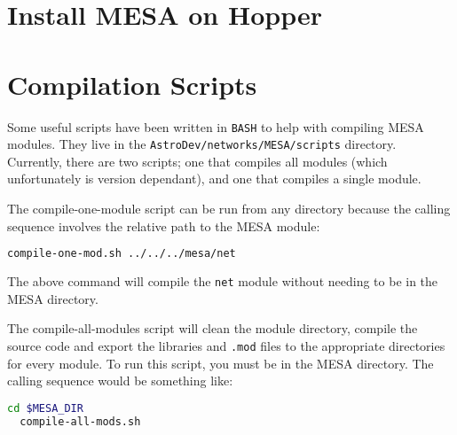 \section{Install {\sf MESA} on Hopper}
\label{sec:hopper_install}



\section{Compilation Scripts}
 \label{sec:compile_scripts}

Some useful scripts have been written in {\tt BASH} to help with compiling 
{\sf MESA} modules. They live in the {\tt AstroDev/networks/MESA/scripts} 
directory. Currently, there are two scripts; one that compiles all modules 
(which unfortunately is version dependant), and one that compiles a single 
module.

The compile-one-module script can be run from any directory because the 
calling sequence involves the relative path to the {\sf MESA} module:
\begin{lstlisting}[language=bash,mathescape=false]
  compile-one-mod.sh ../../../mesa/net
\end{lstlisting}
The above command will compile the {\tt net} module without needing to be in 
the {\sf MESA} directory.

The compile-all-modules script will clean the module directory, compile the 
source code and export the libraries and {\tt .mod} files to the appropriate 
directories for every module. To run this script, you must be in the {\sf MESA} 
directory. The calling sequence would be something like:
\begin{lstlisting}[language=bash,mathescape=false]
  cd $MESA_DIR
  compile-all-mods.sh
\end{lstlisting}




